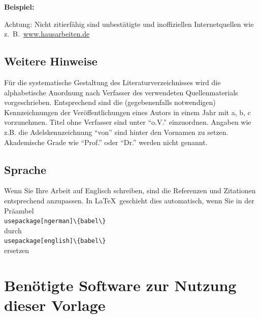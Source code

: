 \documentclass[a4paper,12pt]{scrartcl} %
\begin{document}
\textbf{Beispiel:}

Achtung: Nicht zitierfähig sind unbestätigte und inoffiziellen Internetquellen wie z.~B.\ \url{www.hausarbeiten.de}

\subsection{Weitere Hinweise}

Für die systematische Gestaltung des Literaturverzeichnisses wird die alphabetische Anordnung nach Verfasser des verwendeten Quellenmaterials vorgeschrieben. Entsprechend sind die (gegebenenfalls notwendigen) Kennzeichnungen der Veröffentlichungen eines Autors in einem Jahr mit a, b, c vorzunehmen. Titel ohne Verfasser sind unter ``o.V.'' einzuordnen. Angaben wie z.B. die Adelskennzeichnung ``von'' sind hinter den Vornamen zu setzen. Akademische Grade wie ``Prof.'' oder ``Dr.'' werden nicht genannt.

\subsection{Sprache}
Wenn Sie Ihre Arbeit auf Englisch schreiben, sind die Referenzen und Zitationen entsprechend anzupassen. In \LaTeX\ geschieht dies automatisch, wenn Sie in der Präambel\\
\verb|usepackage[ngerman]\{babel\}|\\
durch\\
\verb|usepackage[english]\{babel\}|\\
ersetzen

\section{Benötigte Software zur Nutzung dieser Vorlage}\label{sec:Latex}
\end{document}
